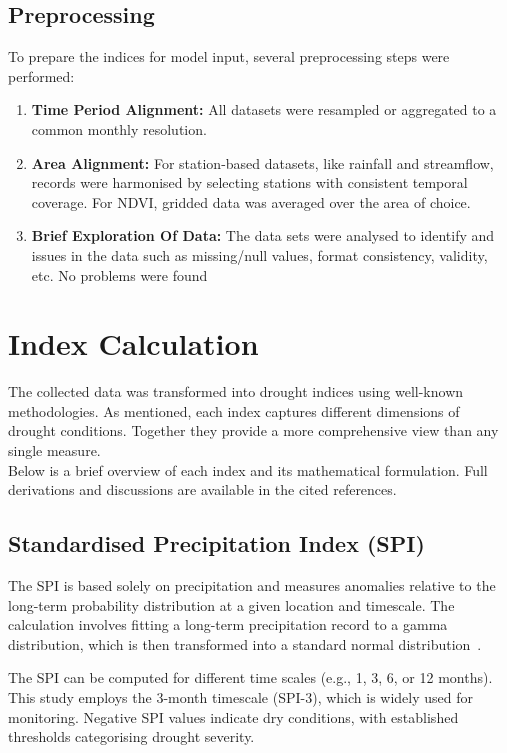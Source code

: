 \subsection{Preprocessing}


To prepare the indices for model input, several preprocessing steps were performed:  
\begin{enumerate}
    \item \textbf{Time Period Alignment:} All datasets were resampled or aggregated to a common monthly resolution.  
    \item \textbf{Area Alignment:} For station-based datasets, like rainfall and streamflow, records were harmonised by selecting stations with consistent temporal coverage. For NDVI, gridded data was averaged over the area of choice. 
    \item \textbf{Brief Exploration Of Data:} The data sets were analysed to identify and issues in the data such as missing/null values, format consistency, validity, etc. No problems were found
\end{enumerate}


\section{Index Calculation}
\label{sec:index-calc}
The collected data was transformed into drought indices using well-known methodologies. As mentioned, each index captures different dimensions of drought conditions. Together they provide a more comprehensive view than any single measure. \\
Below is a brief overview of each index and its mathematical formulation. Full derivations and discussions are available in the cited references.

\subsection{Standardised Precipitation Index (SPI)}

The SPI is based solely on precipitation and measures anomalies relative to the long-term probability distribution at a given location and timescale. The calculation involves fitting a long-term precipitation record to a gamma distribution, which is then transformed into a standard normal distribution~\cite{spi_seminal_paper}.

The SPI can be computed for different time scales (e.g., 1, 3, 6, or 12 months). This study employs the 3-month timescale (SPI-3), which is widely used for monitoring. Negative SPI values indicate dry conditions, with established thresholds categorising drought severity.

